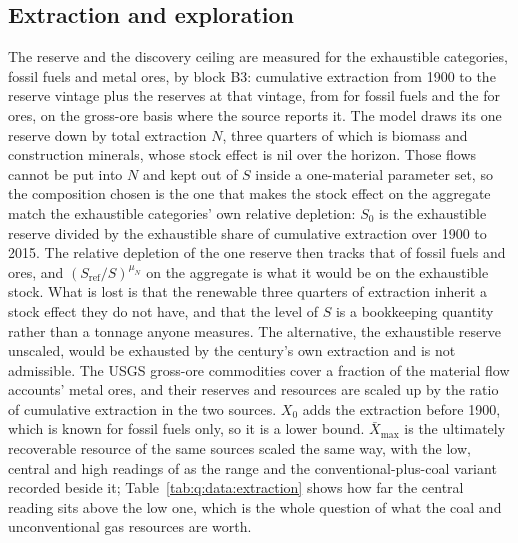 

\subsection{Extraction and exploration}\label{sec:q:data:extraction}

 The reserve and the discovery ceiling are measured for the exhaustible categories, fossil fuels and metal ores, by block B3: cumulative extraction from 1900 to the reserve vintage plus the reserves at that vintage, from \textcite{rogner2012} for fossil fuels and the \textcite{usgs2026mcs} for ores, on the gross-ore basis where the source reports it. The model draws its one reserve down by total extraction $N$, three quarters of which is biomass and construction minerals, whose stock effect is nil over the horizon. Those flows cannot be put into $N$ and kept out of $S$ inside a one-material parameter set, so the composition chosen is the one that makes the stock effect on the aggregate match the exhaustible categories' own relative depletion: $S_0$ is the exhaustible reserve divided by the exhaustible share of cumulative extraction over 1900 to 2015. The relative depletion of the one reserve then tracks that of fossil fuels and ores, and $\left(S_{\mathrm{ref}}/S\right)^{\mu_N}$ on the aggregate is what it would be on the exhaustible stock. What is lost is that the renewable three quarters of extraction inherit a stock effect they do not have, and that the level of $S$ is a bookkeeping quantity rather than a tonnage anyone measures. The alternative, the exhaustible reserve unscaled, would be exhausted by the century's own extraction and is not admissible. The USGS gross-ore commodities cover a fraction of the material flow accounts' metal ores, and their reserves and resources are scaled up by the ratio of cumulative extraction in the two sources. $X_0$ adds the extraction before 1900, which is known for fossil fuels only, so it is a lower bound. $\bar X_{\max}$ is the ultimately recoverable resource of the same sources scaled the same way, with the low, central and high readings of \textcite{rogner2012} as the range and the conventional-plus-coal variant recorded beside it; Table~\ref{tab:q:data:extraction} shows how far the central reading sits above the low one, which is the whole question of what the coal and unconventional gas resources are worth.

